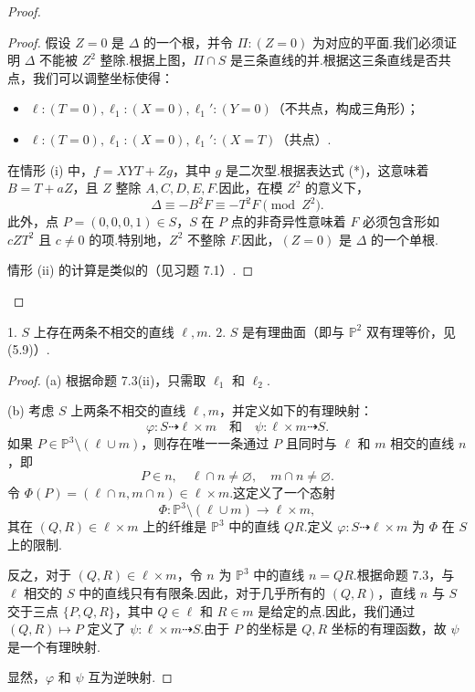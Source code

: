 \begin{proof}
\begin{proof}
假设 \(Z=0\) 是 \(\Delta\) 的一个根，并令 \(\Pi: (Z=0)\) 为对应的平面.我们必须证明 \(\Delta\) 不能被 \(Z^2\) 整除.根据上图，\(\Pi \cap S\) 是三条直线的并.根据这三条直线是否共点，我们可以调整坐标使得：
\begin{itemize}
    \item[(i)] \(\ell: (T=0), \ell_1: (X=0), \ell_1': (Y=0)\)（不共点，构成三角形）；
    \item[(ii)] \(\ell: (T=0), \ell_1: (X=0), \ell_1': (X=T)\)（共点）.
\end{itemize}
在情形 (i) 中，\(f = XYT + Zg\)，其中 \(g\) 是二次型.根据表达式 (*)，这意味着 \(B = T + aZ\)，且 \(Z\) 整除 \(A,C,D,E,F\).因此，在模 \(Z^2\) 的意义下，
\[
\Delta \equiv -B^2F \equiv -T^2F \pmod{Z^2}.
\]
此外，点 \(P=(0,0,0,1) \in S\)，\(S\) 在 \(P\) 点的非奇异性意味着 \(F\) 必须包含形如 \(cZT^2\) 且 \(c \neq 0\) 的项.特别地，\(Z^2\) 不整除 \(F\).因此，\((Z=0)\) 是 \(\Delta\) 的一个单根.

情形 (ii) 的计算是类似的（见习题 7.1）.
\end{proof}
\end{proof}

\begin{corollary}
1. \(S\) 上存在两条不相交的直线 \(\ell, m\).
2. \(S\) 是有理曲面（即与 \({\mathbb{P}}^{2}\) 双有理等价，见 (5.9)）.
\end{corollary}

\begin{proof}
(a) 根据命题 7.3(ii)，只需取 \(\ell_1\) 和 \(\ell_2\).

(b) 考虑 \(S\) 上两条不相交的直线 \(\ell, m\)，并定义如下的有理映射：
\[
\varphi: S \dashrightarrow \ell \times m \quad \text{和} \quad \psi: \ell \times m \dashrightarrow S.
\]
如果 \(P \in {\mathbb{P}}^{3} \setminus (\ell \cup m)\)，则存在唯一一条通过 \(P\) 且同时与 \(\ell\) 和 \(m\) 相交的直线 \(n\)，即
\[
P \in n, \quad \ell \cap n \neq \varnothing, \quad m \cap n \neq \varnothing.
\]
令 \(\Phi(P) = (\ell \cap n, m \cap n) \in \ell \times m\).这定义了一个态射
\[
\Phi: {\mathbb{P}}^{3} \setminus (\ell \cup m) \to \ell \times m,
\]
其在 \((Q,R) \in \ell \times m\) 上的纤维是 \({\mathbb{P}}^{3}\) 中的直线 \(QR\).定义 \(\varphi: S \dashrightarrow \ell \times m\) 为 \(\Phi\) 在 \(S\) 上的限制.

反之，对于 \((Q,R) \in \ell \times m\)，令 \(n\) 为 \({\mathbb{P}}^{3}\) 中的直线 \(n=QR\).根据命题 7.3，与 \(\ell\) 相交的 \(S\) 中的直线只有有限条.因此，对于几乎所有的 \((Q,R)\)，直线 \(n\) 与 \(S\) 交于三点 \(\{P,Q,R\}\)，其中 \(Q \in \ell\) 和 \(R \in m\) 是给定的点.因此，我们通过 \((Q,R) \mapsto P\) 定义了 \(\psi: \ell \times m \dashrightarrow S\).由于 \(P\) 的坐标是 \(Q,R\) 坐标的有理函数，故 \(\psi\) 是一个有理映射.

显然，\(\varphi\) 和 \(\psi\) 互为逆映射.
\end{proof}


